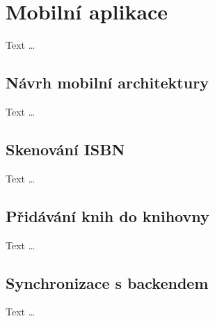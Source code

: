 
\section{Mobilní aplikace}
Text \dots


\subsection{Návrh mobilní architektury}
Text \dots


\subsection{Skenování ISBN}
Text \dots


\subsection{Přidávání knih do knihovny}
Text \dots


\subsection{Synchronizace s backendem}
Text \dots



